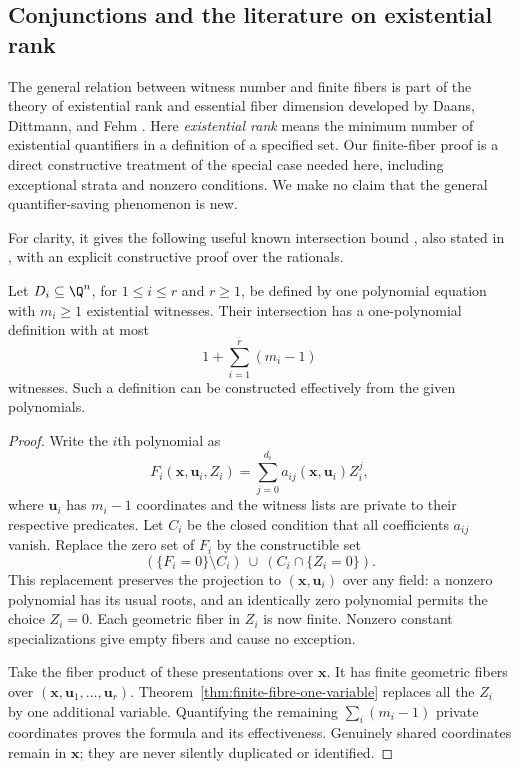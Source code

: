 \subsection{Conjunctions and the literature on existential rank}
\label{subsec:intersection-rank}

The general relation between witness number and finite fibers is part of
the theory of existential rank and essential fiber dimension developed
by Daans, Dittmann, and Fehm \cite[Corollary 4.21]{DDF2025}. Here
\emph{existential rank} means the minimum number of existential
quantifiers in a definition of a specified set. Our finite-fiber proof
is a direct constructive treatment of the special case needed here,
including exceptional strata and nonzero conditions. We make no claim
that the general quantifier-saving phenomenon is new.

For clarity, it gives the following useful known intersection bound
\cite[Theorem 1.4]{DDF2025}, also stated in
\cite[Theorem 2.5]{Daans2024}, with an explicit constructive proof over
the rationals.

\begin{proposition}\label{prop:intersection-rank}
Let $D_i\subseteq\Q^n$, for $1\le i\le r$ and $r\ge1$, be
defined by one polynomial equation with $m_i\ge1$ existential
witnesses. Their intersection has a one-polynomial definition with at
most
\[
 1+\sum_{i=1}^r(m_i-1)
\]
witnesses. Such a definition can be constructed effectively from the
given polynomials.
\end{proposition}
\begin{proof}
Write the $i$th polynomial as
\[
 F_i(\mathbf x,\mathbf u_i,Z_i)
   =\sum_{j=0}^{d_i}a_{ij}(\mathbf x,\mathbf u_i)Z_i^j,
\]
where $\mathbf u_i$ has $m_i-1$ coordinates and the witness lists
are private to their respective predicates. Let $C_i$ be the closed
condition that all coefficients $a_{ij}$ vanish. Replace the zero set
of $F_i$ by the constructible set
\[
 (\{F_i=0\}\setminus C_i)\ \cup\ (C_i\cap\{Z_i=0\}).
\]
This replacement preserves the projection to
$(\mathbf x,\mathbf u_i)$ over any field: a nonzero polynomial has
its usual roots, and an identically zero polynomial permits the choice
$Z_i=0$. Each geometric fiber in $Z_i$ is now finite. Nonzero
constant specializations give empty fibers and cause no exception.

Take the fiber product of these presentations over $\mathbf x$.
It has finite geometric fibers over
$(\mathbf x,\mathbf u_1,\ldots,\mathbf u_r)$.
Theorem~\ref{thm:finite-fibre-one-variable} replaces all the $Z_i$
by one additional variable. Quantifying the remaining
$\sum_i(m_i-1)$ private coordinates proves the formula and its
effectiveness. Genuinely shared coordinates remain in $\mathbf x$;
they are never silently duplicated or identified.
\end{proof}

